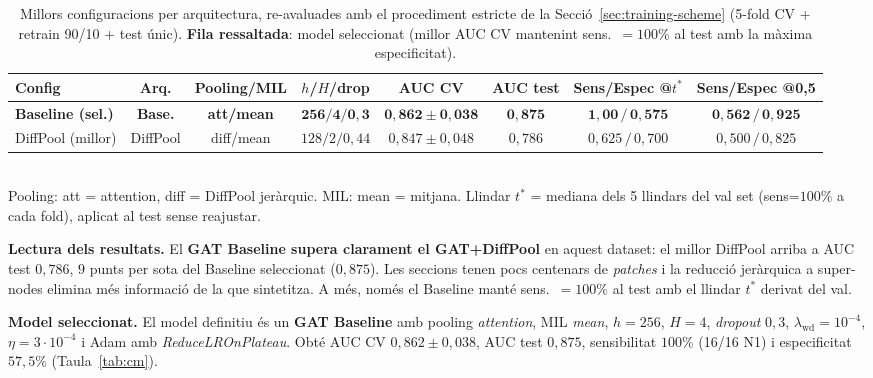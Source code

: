 \documentclass[10pt,a4paper,twocolumn,twoside]{article}
\begin{document}
\begin{table}[t]
\centering
\caption{Millors configuracions per arquitectura, re-avaluades amb el procediment estricte
de la Secció~\ref{sec:training-scheme} (5-fold CV + retrain 90/10 + test únic).
\textbf{Fila ressaltada}: model seleccionat (millor AUC CV mantenint sens.\ $=100\%$ al
test amb la màxima especificitat).}
\label{tab:configs-compare}
\small
\begin{tabular}{lccccccc}
\toprule
\textbf{Config} & \textbf{Arq.} & \textbf{Pooling/MIL}
  & \textbf{$h$/$H$/drop} & \textbf{AUC CV} & \textbf{AUC test}
  & \textbf{Sens/Espec @$t^*$} & \textbf{Sens/Espec @0,5} \\
\midrule
\textbf{Baseline (sel.)} & \textbf{Base.} & \textbf{att/mean}      & $\mathbf{256/4/0{,}3}$ & $\mathbf{0{,}862\!\pm\!0{,}038}$ & $\mathbf{0{,}875}$ & $\mathbf{1{,}00\,/\,0{,}575}$ & $\mathbf{0{,}562\,/\,0{,}925}$ \\
DiffPool (millor)       & DiffPool & diff/mean     & $128/2/0{,}44$ & $0{,}847\!\pm\!0{,}048$ & $0{,}786$ & $0{,}625\,/\,0{,}700$ & $0{,}500\,/\,0{,}825$ \\
\bottomrule
\end{tabular}\\[2pt]
\footnotesize{Pooling: att = attention, diff = DiffPool jeràrquic. MIL: mean = mitjana.
Llindar $t^*$ = mediana dels 5 llindars del val set (sens=$100\%$ a cada fold),
aplicat al test sense reajustar.}
\end{table}

\textbf{Lectura dels resultats.} El \textbf{GAT Baseline supera clarament el GAT+DiffPool}
en aquest dataset: el millor DiffPool arriba a AUC test $0{,}786$, $9$ punts per sota del
Baseline seleccionat ($0{,}875$). Les seccions tenen pocs centenars de \textit{patches} i
la reducció jeràrquica a super-nodes elimina més informació de la que sintetitza. A més,
només el Baseline manté sens.\ $=100\%$ al test amb el llindar $t^*$ derivat del val.

\textbf{Model seleccionat.} El model definitiu és un \textbf{GAT Baseline} amb pooling
\textit{attention}, MIL \textit{mean}, $h=256$, $H=4$, \textit{dropout} $0{,}3$,
$\lambda_{\text{wd}}=10^{-4}$, $\eta=3\!\cdot\!10^{-4}$ i Adam amb \textit{ReduceLROnPlateau}.
Obté AUC CV $0{,}862\pm 0{,}038$, AUC test $0{,}875$, sensibilitat $100\%$ (16/16 N1) i
especificitat $57{,}5\%$ (Taula~\ref{tab:cm}).
\end{document}
